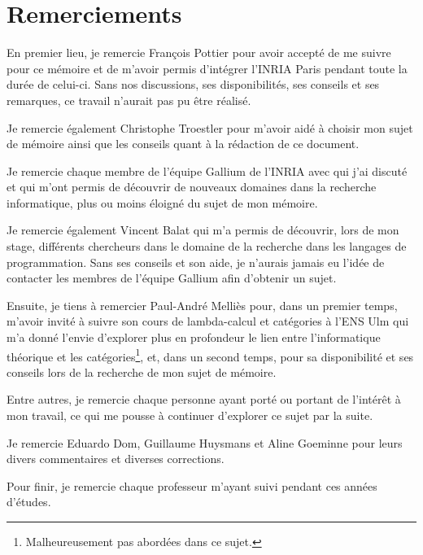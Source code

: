 \chapter*{Remerciements}

En premier lieu, je remercie François Pottier pour avoir accepté de me suivre
pour ce mémoire et de m'avoir permis d'intégrer l'INRIA Paris pendant toute la
durée de celui-ci. Sans nos discussions, ses disponibilités, ses conseils et ses
remarques, ce travail n'aurait pas pu être réalisé.

Je remercie également Christophe Troestler pour m'avoir aidé à choisir mon sujet
de mémoire ainsi que les conseils quant à la rédaction de ce document.

Je remercie chaque membre de l'équipe Gallium de
l'INRIA avec qui j'ai discuté et qui m'ont permis de découvrir de nouveaux
domaines dans la recherche informatique, plus ou moins éloigné du sujet de mon mémoire.

Je remercie également Vincent Balat qui m'a permis de découvrir, lors de mon
stage, différents chercheurs dans le domaine de la recherche dans les langages de
programmation. Sans ses conseils et son aide, je n'aurais jamais eu l'idée de contacter
les membres de l'équipe Gallium afin d'obtenir un sujet.

Ensuite, je tiens à remercier Paul-André Melliès pour, dans un premier temps,
m'avoir invité à suivre son cours de lambda-calcul et catégories à l'ENS Ulm qui
m'a donné l'envie d'explorer plus en profondeur le lien entre l'informatique
théorique et les catégories\footnote{Malheureusement pas abordées dans ce sujet.}, et,
dans un second temps, pour sa disponibilité et ses conseils lors de la recherche
de mon sujet de mémoire.

Entre autres, je remercie chaque personne ayant porté ou portant de l'intérêt à mon
travail, ce qui me pousse à continuer d'explorer ce sujet par la suite.

Je remercie Eduardo Dom, Guillaume Huysmans et Aline Goeminne pour leurs
divers commentaires et diverses corrections.


Pour finir, je remercie chaque professeur m'ayant suivi pendant ces années
d'études.
